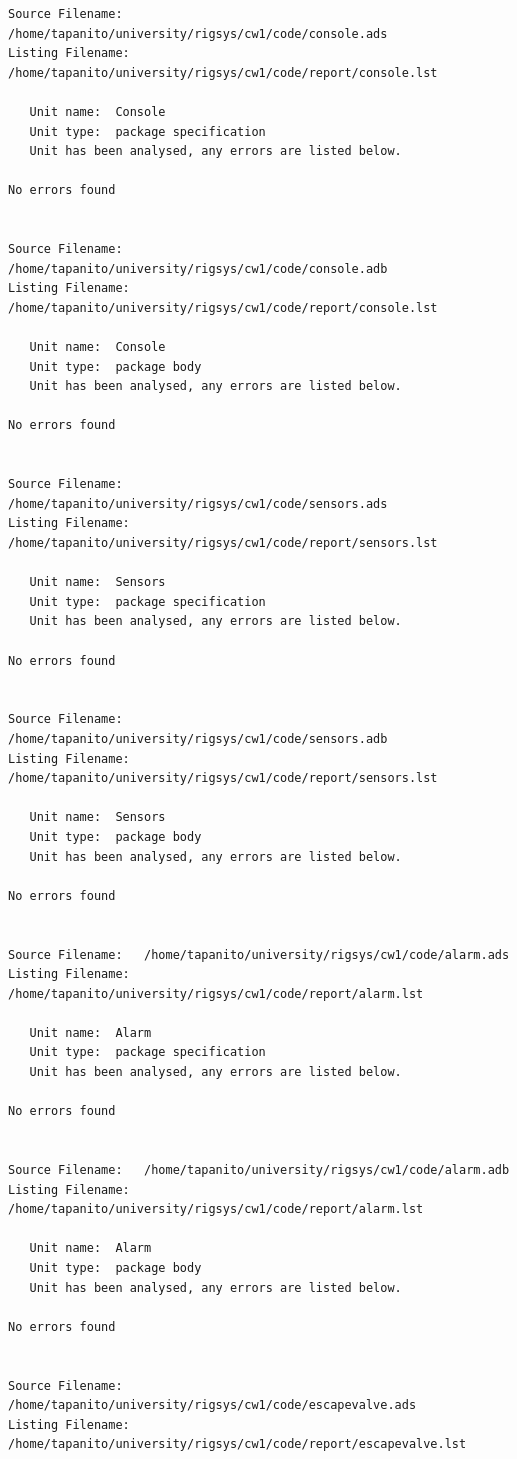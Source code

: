 \documentclass[a4paper, titlepage]{article}
\begin{document}
{\begin{lstlisting}
Source Filename:   /home/tapanito/university/rigsys/cw1/code/console.ads
Listing Filename:  /home/tapanito/university/rigsys/cw1/code/report/console.lst

   Unit name:  Console
   Unit type:  package specification
   Unit has been analysed, any errors are listed below.

No errors found


Source Filename:   /home/tapanito/university/rigsys/cw1/code/console.adb
Listing Filename:  /home/tapanito/university/rigsys/cw1/code/report/console.lst

   Unit name:  Console
   Unit type:  package body
   Unit has been analysed, any errors are listed below.

No errors found


Source Filename:   /home/tapanito/university/rigsys/cw1/code/sensors.ads
Listing Filename:  /home/tapanito/university/rigsys/cw1/code/report/sensors.lst

   Unit name:  Sensors
   Unit type:  package specification
   Unit has been analysed, any errors are listed below.

No errors found


Source Filename:   /home/tapanito/university/rigsys/cw1/code/sensors.adb
Listing Filename:  /home/tapanito/university/rigsys/cw1/code/report/sensors.lst

   Unit name:  Sensors
   Unit type:  package body
   Unit has been analysed, any errors are listed below.

No errors found


Source Filename:   /home/tapanito/university/rigsys/cw1/code/alarm.ads
Listing Filename:  /home/tapanito/university/rigsys/cw1/code/report/alarm.lst

   Unit name:  Alarm
   Unit type:  package specification
   Unit has been analysed, any errors are listed below.

No errors found


Source Filename:   /home/tapanito/university/rigsys/cw1/code/alarm.adb
Listing Filename:  /home/tapanito/university/rigsys/cw1/code/report/alarm.lst

   Unit name:  Alarm
   Unit type:  package body
   Unit has been analysed, any errors are listed below.

No errors found


Source Filename:   /home/tapanito/university/rigsys/cw1/code/escapevalve.ads
Listing Filename:  /home/tapanito/university/rigsys/cw1/code/report/escapevalve.lst


\end{lstlisting}}
\end{document}
